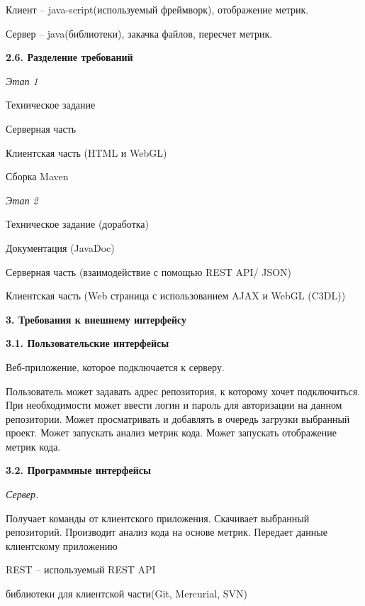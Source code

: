 \documentclass[a4paper,12pt]{article}
\begin{document}
		Клиент – java-script(используемый фреймворк), отображение метрик.
		
		Сервер – java(библиотеки), закачка файлов, пересчет метрик.
		\newline
		
	\textbf{2.6. Разделение требований}
	
		\textit{Этап 1}
		
		Техническое задание
                    
                Серверная часть
		
		Клиентская часть (HTML и WebGL) 
                
                Сборка Maven
		
                \textit{Этап 2}
		
		Техническое задание (доработка)

                Документация (JavaDoc)
                    
                Серверная часть (взаимодействие с помощью REST API/ JSON)
		
		Клиентская часть (Web страница с использованием AJAX и WebGL (C3DL)) 
                
\maketitle
\newpage
\textbf{3. Требования к внешнему интерфейсу}
\newline

	\textbf{3.1. Пользовательские интерфейсы}
	
	Веб-приложение, которое подключается к серверу.
	
	Пользователь может задавать адрес репозитория, к которому хочет подключиться. При необходимости может ввести логин и пароль для авторизации на данном репозитории. Может просматривать и добавлять в очередь загрузки выбранный проект. Может запускать анализ метрик кода. Может запускать отображение метрик кода.
        \newline
	
	\textbf{3.2. Программные интерфейсы}
	
		\textit{Сервер.}
		
		Получает команды от клиентского приложения. Скачивает выбранный репозиторий. Производит анализ кода на основе метрик. Передает данные клиентскому приложению
		
		REST – используемый REST API
		
		библиотеки для клиентской части(Git, Mercurial, SVN)
	
\end{document}
